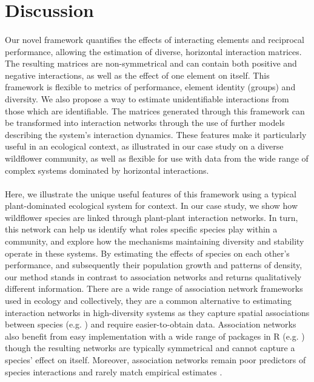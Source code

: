 \documentclass[a4,12pt]{article}
\begin{document}
    

\section{Discussion}
    



    \paragraph{} 
    Our novel framework quantifies the effects of interacting elements and reciprocal performance, allowing the estimation of diverse, horizontal interaction matrices. The resulting matrices are non-symmetrical and can contain both positive and negative interactions, as well as the effect of one element on itself. This framework is flexible to metrics of performance, element identity (groups) and diversity. We also propose a way to estimate unidentifiable interactions from those which are identifiable. The matrices generated through this framework can be transformed into interaction networks through the use of further models describing the system's interaction dynamics. These features make it particularly useful in an ecological context, as illustrated in our case study on a diverse wildflower community, as well as flexible for use with data from the wide range of complex systems dominated by horizontal interactions.

    \paragraph{}
    Here, we illustrate the unique useful features of this framework using a typical plant-dominated ecological system for context. In our case study, we show how wildflower species are linked through  plant-plant interaction networks. In turn, this network can help us identify what roles specific species play within a community, and explore how the mechanisms maintaining diversity and stability operate in these systems. By estimating the effects of species on each other's performance, and subsequently their population growth and patterns of density, our method stands in contrast to association networks and returns qualitatively different information. There are a wide range of association network frameworks used in ecology \parencite{Burns2010, Losapio2018, Montesinos-Navarro2018} and collectively, they are a common alternative to estimating interaction networks in high-diversity systems as they capture spatial associations between species (e.g. \cite{Saiz2018}) and require easier-to-obtain data. Association networks also benefit from easy implementation with a wide range of packages in R (e.g. \cite{Griffith2016}) though the resulting networks are typically symmetrical and cannot capture a species' effect on itself. Moreover, association networks remain poor predictors of species interactions and rarely match empirical estimates \parencite{Sander2017,Barner2018, Thurman2019, Blanchet2020}.
\end{document}
